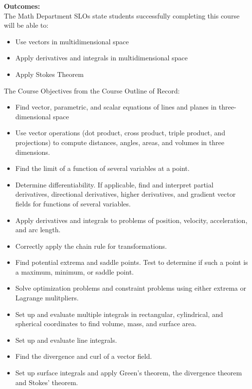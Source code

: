 \documentclass[letterpaper,10pt]{article}
\begin{document}
\noindent\textbf{Outcomes:}\\The Math Department SLOs state students successfully completing this course will be able to:
\begin{itemize}
\item Use vectors in multidimensional space
\item Apply derivatives and integrals in multidimensional space
\item Apply Stokes Theorem
\end{itemize}
The Course Objectives from the Course Outline of Record:
\begin{itemize}
\item Find vector, parametric, and scalar equations of lines and planes in
three-dimensional space
\item Use vector operations (dot product, cross product, triple product, and projections)
to compute distances, angles, areas, and volumes in three dimensions.
\item Find the limit of a function of several variables at a point.
\item Determine differentiability. If applicable, find and interpret partial derivatives,
directional derivatives, higher derivatives, and gradient vector fields for functions of
several variables.
\item Apply derivatives and integrals to problems of position, velocity, acceleration, and
arc length.
\item Correctly apply the chain rule for transformations.
\item Find potential extrema and saddle points. Test to determine if such a point is a
maximum, minimum, or saddle point.
\item Solve optimization problems and constraint problems using either extrema or
Lagrange mulitpliers.
\item Set up and evaluate multiple integrals in rectangular, cylindrical, and spherical
coordinates to find volume, mass, and surface area.
\item Set up and evaluate line integrals.
\item Find the divergence and curl of a vector field.
\item Set up surface integrals and apply Green's theorem, the divergence theorem and
Stokes' theorem. 
\end{itemize}




\clearpage
\end{document}
